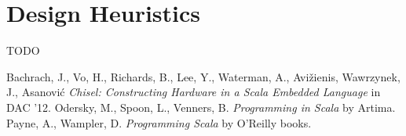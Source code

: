 \documentclass[10pt,twocolumn]{article}
\begin{document}
\section{Design Heuristics}
\label{sec:heuristics}

TODO


% 
\begin{thebibliography}{50}
 Bachrach, J., Vo, H., Richards, B., Lee, Y., Waterman,
  A., Avi\v{z}ienis, Wawrzynek, J., Asanovi\'{c} \textsl{Chisel:
    Constructing Hardware in a Scala Embedded Language}
in DAC '12.
Odersky, M., Spoon, L., Venners,
  B. \textsl{Programming in Scala} by Artima.
Payne, A., Wampler, D.
  \textsl{Programming Scala} by O'Reilly books.
\end{thebibliography}
 
\end{document}
